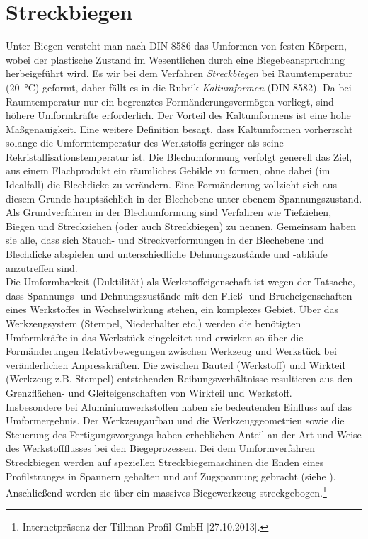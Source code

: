 \documentclass[12pt,a4paper,parskip,twoside,BCOR5mm,headsepline]{scrartcl}
\begin{document}
	 	 	 	 
	 	 	 	 

\section{Streckbiegen}
Unter Biegen versteht man nach DIN 8586 das Umformen von festen Körpern, wobei der plastische Zustand im Wesentlichen durch eine Biegebeanspruchung herbeigeführt wird. \autocite[376]{hu} Es wir bei dem Verfahren \emph{Streckbiegen} bei Raumtemperatur (\SI{20}{\degreeCelsius})  geformt, daher fällt es in die Rubrik \emph{Kaltumformen} (DIN 8582). Da bei Raumtemperatur nur ein begrenztes Formänderungsvermögen vorliegt, sind höhere Umformkräfte erforderlich. Der Vorteil des Kaltumformens ist eine hohe Maßgenauigkeit. \autocite[8]{hu}  Eine weitere Definition besagt, dass Kaltumformen vorherrscht solange die Umformtemperatur des Werkstoffs geringer als seine Rekristallisationstemperatur ist. \autocite[187]{fu}  Die Blechumformung verfolgt generell das Ziel, aus einem Flachprodukt ein räumliches Gebilde zu formen, ohne dabei (im Idealfall) die Blechdicke zu verändern.  Eine Formänderung vollzieht sich aus diesem Grunde hauptsächlich in der Blechebene unter ebenem Spannungszustand. Als Grundverfahren in der Blechumformung sind Verfahren wie Tiefziehen, Biegen und Streckziehen (oder auch Streckbiegen) zu nennen. Gemeinsam haben sie alle, dass sich Stauch- und Streckverformungen in der Blechebene und Blechdicke abspielen und unterschiedliche Dehnungszustände und -abläufe anzutreffen sind.\\ Die Umformbarkeit (Duktilität) als Werkstoffeigenschaft ist wegen der Tatsache, dass  Spannungs- und Dehnungszustände mit den Fließ- und Brucheigenschaften eines Werkstoffes in Wechselwirkung stehen, ein komplexes Gebiet. Über das Werkzeugsystem (Stempel, Niederhalter etc.) werden die benötigten Umformkräfte in das Werkstück eingeleitet und erwirken so über die  Formänderungen Relativbewegungen zwischen Werkzeug und Werkstück bei veränderlichen Anpresskräften. Die zwischen Bauteil (Werkstoff) und Wirkteil (Werkzeug z.B. Stempel) entstehenden Reibungsverhältnisse resultieren aus den  Grenzflächen- und Gleiteigenschaften von Wirkteil und Werkstoff.\\ Insbesondere bei Aluminiumwerkstoffen haben sie bedeutenden Einfluss auf das Umformergebnis. Der Werkzeugaufbau und die Werkzeuggeometrien sowie die Steuerung des Fertigungsvorgangs haben erheblichen Anteil an der Art und Weise des Werkstoffflusses bei den Biegeprozessen. \autocite[499]{aa}
Bei dem Umformverfahren Streckbiegen werden auf speziellen Streckbiegemaschinen die Enden eines Profilstranges in Spannern gehalten und auf  Zugspannung gebracht (siehe  ). Anschließend werden sie über ein massives Biegewerkzeug streckgebogen.\footnote{Internetpräsenz der Tillman Profil GmbH [27.10.2013].} 
\end{document}
